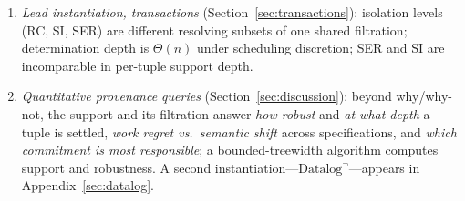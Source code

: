 \begin{enumerate}[label=(\roman*),nosep,leftmargin=*]
          out incomparable in per-tuple support depth.
  \else
  \item \emph{Lead instantiation, transactions} (Section~\ref{sec:transactions}):
        isolation levels (RC, SI, SER) are different resolving subsets of one
        shared filtration; determination depth is $\Theta(n)$ under scheduling
        discretion; SER and SI are incomparable in per-tuple support depth.
  \item \emph{Quantitative provenance queries}
        (Section~\ref{sec:discussion}): beyond why/why-not, the support and its
        filtration answer \emph{how robust} and \emph{at what depth} a tuple is
        settled, \emph{work regret vs.\ semantic shift} across specifications,
        and \emph{which commitment is most responsible}; a bounded-treewidth
        algorithm computes support and robustness. A second
        instantiation---$\mbox{Datalog}^\neg$---appears in
        Appendix~\ref{sec:datalog}.
  \fi
\end{enumerate}

